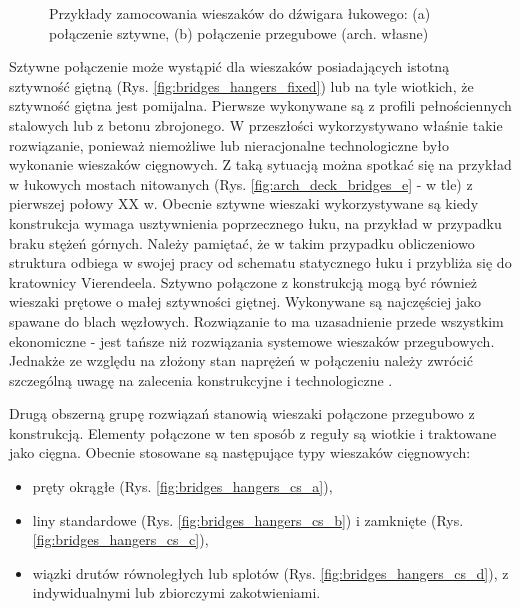 \begin{figure}[hbt!]
	\centering
	\captionsetup{justification=centering}
	\caption{Przykłady zamocowania wieszaków do dźwigara łukowego: (a) połączenie sztywne, (b) połączenie przegubowe (arch. własne)}
	\label{fig:bridges_hangers_exp}
\end{figure}

Sztywne połączenie może wystąpić dla wieszaków posiadających istotną sztywność giętną (Rys. \ref{fig:bridges_hangers_fixed}) lub na tyle wiotkich, że sztywność giętna jest pomijalna. Pierwsze wykonywane są z profili pełnościennych stalowych lub z betonu zbrojonego. W przeszłości wykorzystywano właśnie takie rozwiązanie, ponieważ niemożliwe lub nieracjonalne technologiczne było wykonanie wieszaków cięgnowych. Z taką sytuacją można spotkać się na przykład w łukowych mostach nitowanych (Rys. \ref{fig:arch_deck_bridges_e}  - w tle) z pierwszej połowy XX w. Obecnie sztywne wieszaki wykorzystywane są kiedy konstrukcja wymaga usztywnienia poprzecznego łuku, na przykład w przypadku braku stężeń górnych. Należy pamiętać, że w takim przypadku obliczeniowo struktura odbiega w swojej pracy od schematu statycznego łuku i przybliża się do kratownicy Vierendeela. Sztywno połączone z konstrukcją mogą być również wieszaki prętowe o małej sztywności giętnej. Wykonywane są najczęściej jako spawane do blach węzłowych. Rozwiązanie to ma uzasadnienie przede wszystkim ekonomiczne - jest tańsze niż rozwiązania systemowe wieszaków przegubowych. Jednakże ze względu na złożony stan naprężeń w połączeniu należy zwrócić szczególną uwagę na zalecenia konstrukcyjne i technologiczne \parencite{Gunther2000,BundesanstaltfurWasserbauHg.2018,Szafranski2017}. 

Drugą obszerną grupę rozwiązań stanowią wieszaki połączone przegubowo z konstrukcją. Elementy połączone w ten sposób z reguły są wiotkie i traktowane jako cięgna. Obecnie stosowane są następujące typy wieszaków cięgnowych:
\begin{itemize}
	\item pręty okrągłe (Rys. \ref{fig:bridges_hangers_cs_a}),
	\item liny standardowe (Rys. \ref{fig:bridges_hangers_cs_b}) i zamknięte (Rys. \ref{fig:bridges_hangers_cs_c}),
	\item wiązki drutów równoległych lub splotów (Rys. \ref{fig:bridges_hangers_cs_d}), z indywidualnymi lub zbiorczymi zakotwieniami.
\end{itemize}

